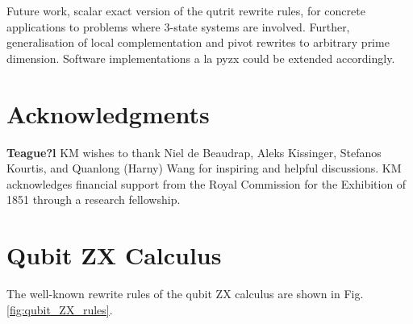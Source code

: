 \documentclass[submission,copyright,creativecommons]{eptcs}
\begin{document}
Future work, scalar exact version of the qutrit rewrite rules,
for concrete applications to problems where $3$-state systems are involved.
Further,
generalisation of local complementation and pivot rewrites to arbitrary prime dimension.
Software implementations a la pyzx could be extended accordingly.



\section{Acknowledgments}
{\bf Teague?l}
KM wishes to thank Niel de Beaudrap, Aleks Kissinger, Stefanos 
Kourtis, and Quanlong (Harny) Wang for inspiring and helpful discussions.
KM acknowledges financial support from the Royal Commission for the Exhibition of 1851 through a research fellowship.








\appendix

\section{Qubit ZX Calculus}

The well-known rewrite rules of the qubit ZX calculus are shown in Fig.\ref{fig:qubit_ZX_rules}.
\end{document}
